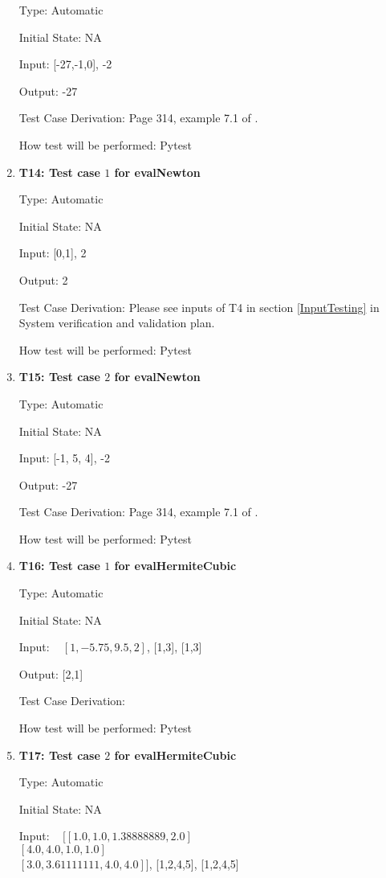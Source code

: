 \documentclass[12pt, titlepage]{article}
\begin{document}
\begin{enumerate}
Type: Automatic

Initial State: NA 

Input: [-27,-1,0], -2 

Output: -27

Test Case Derivation: Page 314, example 7.1 of \cite{Health1997}. 

How test will be performed: Pytest

\item{\textbf{T14: Test case $1$ for evalNewton}}

Type: Automatic

Initial State: NA 

Input: [0,1], 2 

Output: 2

Test Case Derivation: Please see inputs of T4 in section \ref{InputTesting} in 
System verification and validation plan. 

How test will be performed: Pytest

\item{\textbf{T15: Test case $2$ for evalNewton}}

Type: Automatic

Initial State: NA 

Input: [-1, 5, 4], -2 

Output: -27

Test Case Derivation: Page 314, example 7.1 of \cite{Health1997}. 

How test will be performed: Pytest



\item{\textbf{T16: Test case $1$ for evalHermiteCubic}}

Type: Automatic

Initial State: NA 

Input: ~\newline 
$[1,-5.75, 9.5, 2]$, [1,3], [1,3]						

Output: [2,1]

Test Case Derivation: \cite{HermiteCubic2}

How test will be performed: Pytest

\item{\textbf{T17: Test case $2$ for evalHermiteCubic}}

Type: Automatic

Initial State: NA 

Input: ~\newline 
$[[1.0,1.0, 1.38888889, 2.0]$\\
$[4.0, 4.0, 1.0, 1.0]$\\
$[3.0, 3.61111111, 4.0, 4.0]]$, [1,2,4,5], [1,2,4,5]					


\end{enumerate}
\end{document}
